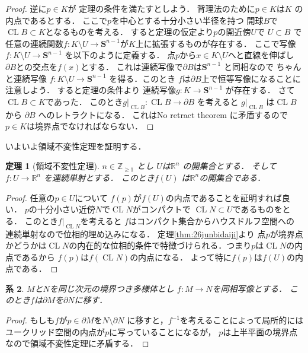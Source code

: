 \documentclass[leqno, a4paper, 12pt]{jsarticle}
\newtheorem{thm}{定理}
\newtheorem{cor}[thm]{系}
\newcommand{\zz}{\mathbb{Z}}
\newcommand{\rr}{\mathbb{R}}
\DeclareMathOperator{\cl}{CL}
\newcommand{\mysphere}[1]{\mathbf{S}^{#1}}
\begin{document}
\begin{proof}
逆に$p\in K$が
定理の条件を満たすとしよう．
背理法のために$p\in K$は$K$
の内点であるとする．
ここで$p$を中心とする十分小さい半径を持つ
開球$B$で$\cl B\subset K$となるものを考える．
すると定理の仮定より$p$の開近傍$U$で
$U\subset B$
で任意の連続関数$f\colon K\setminus U\to \mysphere{n-1}$が$K$上に拡張するものが存在する．
ここで写像
$f\colon K\setminus U\to \mysphere{n-1}$
を以下のように定義する．
点$p$から$x\in K\setminus U$へと直線を伸ばし
$\partial B$との交点を$f(x)$とする．
これは連続写像で$\partial B$は$\mysphere{n-1}$
と同相なので
ちゃんと連続写像
$f\colon K\setminus U\to \mysphere{n-1}$
を得る．このとき
$f$は$\partial B$上で恒等写像になることに注意しよう．
すると定理の条件より
連続写像$g\colon K\to \mysphere{n-1}$
が存在する．
さて$\cl B\subset K$であった．
このとき$g|_{\cl B}\colon \cl B\to \partial B$
を考えると
$g|_{\cl B}$
は$\cl B$から
$\partial B$
へのレトラクトになる．
これはNo retract theorem に矛盾するので
$p\in K$は境界点でなければならない．
\end{proof}


いよいよ領域不変性定理を証明する．
\begin{thm}[領域不変性定理]\label{thm:maininvdomain}
$n\in \zz_{\ge 1}$
とし
$U$は$\rr^{n}$
の開集合とする．
そして
$f\colon U\to \rr^{n}$
を連続単射とする．
このとき$f(U)$
は$\rr^{n}$の開集合である．
\end{thm}
\begin{proof}
任意の$p\in U$について
$f(p)$が$f(U)$の内点であることを証明すれば良い．
$p$の十分小さい近傍$N$で$\cl N$がコンパクトで
$\cl N \subset U$であるものをとる．
このとき$f|_{\cl N}$を考えると
$f$はコンパクト集合からハウスドルフ空間への
連続単射なので位相的埋め込みになる．
定理\ref{thm:26junbidaiji}より
点$p$が境界点かどうかは$\cl N$の内在的な位相的条件で特徴づけられる．つまり$p$は$\cl N$の内点であるから
$f(p)$は$f(\cl N)$の内点になる．
よって特に$f(p)$は$f(U)$の内点である．
\end{proof}


\begin{cor}
$M$と$N$を同じ次元の境界つき多様体とし
$f\colon M\to N$を同相写像とする．
このとき$f$は$\partial M$を$\partial N$に移す．
\end{cor}
\begin{proof}
もしも$f$が$p\in \partial M$を$N\setminus \partial N$
に移すと，$f^{-1}$を考えることによって局所的には
ユークリッド空間の内点が$p$に写っていることになるが，
$p$は上半平面の境界点なので領域不変性定理に矛盾する．
\end{proof}
\end{document}
